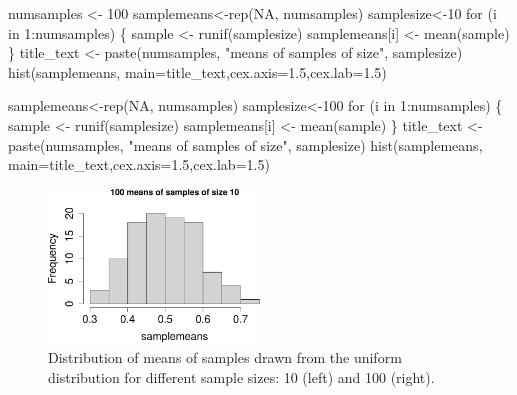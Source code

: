 \documentclass[
  letterpaper,
  DIV=11,
  numbers=noendperiod]{scrreprt}
\newenvironment{Shaded}{\begin{snugshade}}{\end{snugshade}}
\newcommand{\AttributeTok}[1]{\textcolor[rgb]{0.40,0.45,0.13}{#1}}
\newcommand{\ConstantTok}[1]{\textcolor[rgb]{0.56,0.35,0.01}{#1}}
\newcommand{\ControlFlowTok}[1]{\textcolor[rgb]{0.00,0.23,0.31}{#1}}
\newcommand{\DecValTok}[1]{\textcolor[rgb]{0.68,0.00,0.00}{#1}}
\newcommand{\FloatTok}[1]{\textcolor[rgb]{0.68,0.00,0.00}{#1}}
\newcommand{\FunctionTok}[1]{\textcolor[rgb]{0.28,0.35,0.67}{#1}}
\newcommand{\NormalTok}[1]{\textcolor[rgb]{0.00,0.23,0.31}{#1}}
\newcommand{\OtherTok}[1]{\textcolor[rgb]{0.00,0.23,0.31}{#1}}
\newcommand{\SpecialCharTok}[1]{\textcolor[rgb]{0.37,0.37,0.37}{#1}}
\newcommand{\StringTok}[1]{\textcolor[rgb]{0.13,0.47,0.30}{#1}}
\begin{document}
\begin{Shaded}
\begin{Highlighting}[]
\NormalTok{numsamples }\OtherTok{\textless{}{-}} \DecValTok{100}
\NormalTok{samplemeans}\OtherTok{\textless{}{-}}\FunctionTok{rep}\NormalTok{(}\ConstantTok{NA}\NormalTok{, numsamples)}
\NormalTok{samplesize}\OtherTok{\textless{}{-}}\DecValTok{10}
\ControlFlowTok{for}\NormalTok{ (i }\ControlFlowTok{in} \DecValTok{1}\SpecialCharTok{:}\NormalTok{numsamples) \{}
\NormalTok{    sample }\OtherTok{\textless{}{-}} \FunctionTok{runif}\NormalTok{(samplesize)}
\NormalTok{    samplemeans[i] }\OtherTok{\textless{}{-}} \FunctionTok{mean}\NormalTok{(sample)}
\NormalTok{\}}
\NormalTok{title\_text }\OtherTok{\textless{}{-}} \FunctionTok{paste}\NormalTok{(numsamples, }\StringTok{"means of samples of size"}\NormalTok{, samplesize)}
\FunctionTok{hist}\NormalTok{(samplemeans, }\AttributeTok{main=}\NormalTok{title\_text,}\AttributeTok{cex.axis=}\FloatTok{1.5}\NormalTok{,}\AttributeTok{cex.lab=}\FloatTok{1.5}\NormalTok{)}

\NormalTok{samplemeans}\OtherTok{\textless{}{-}}\FunctionTok{rep}\NormalTok{(}\ConstantTok{NA}\NormalTok{, numsamples)}
\NormalTok{samplesize}\OtherTok{\textless{}{-}}\DecValTok{100}
\ControlFlowTok{for}\NormalTok{ (i }\ControlFlowTok{in} \DecValTok{1}\SpecialCharTok{:}\NormalTok{numsamples) \{}
\NormalTok{    sample }\OtherTok{\textless{}{-}} \FunctionTok{runif}\NormalTok{(samplesize)}
\NormalTok{    samplemeans[i] }\OtherTok{\textless{}{-}} \FunctionTok{mean}\NormalTok{(sample)}
\NormalTok{\}}
\NormalTok{title\_text }\OtherTok{\textless{}{-}} \FunctionTok{paste}\NormalTok{(numsamples, }\StringTok{"means of samples of size"}\NormalTok{, samplesize)}
\FunctionTok{hist}\NormalTok{(samplemeans, }\AttributeTok{main=}\NormalTok{title\_text,}\AttributeTok{cex.axis=}\FloatTok{1.5}\NormalTok{,}\AttributeTok{cex.lab=}\FloatTok{1.5}\NormalTok{)}
\end{Highlighting}
\end{Shaded}

\begin{figure}[H]

{\centering \includegraphics[width=0.5\textwidth,height=\textheight]{./sampling_files/figure-pdf/sample-dist-1.pdf}

}

\caption{Distribution of means of samples drawn from the uniform
distribution for different sample sizes: 10 (left) and 100 (right).}

\end{figure}
\end{document}
